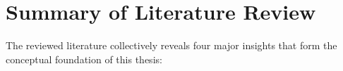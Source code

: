 





\section{Summary of Literature Review}

The reviewed literature collectively reveals four major insights that form the conceptual foundation of this thesis:

